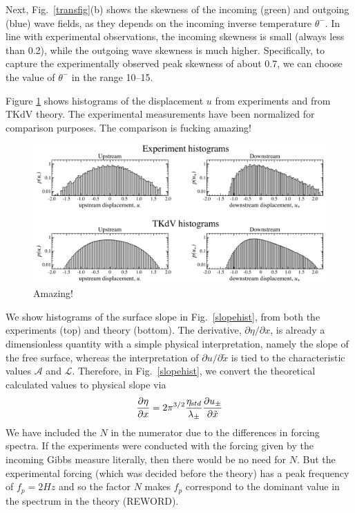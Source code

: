 \documentclass[11pt]{article}
\newcommand{\pd}[2]    { \frac{\partial #1} {\partial #2} }
\newcommand{\freqp}{f_p}
\newcommand{\etastd}{\eta_{\text std}}
\newcommand{\lam}{\lambda}
\newcommand{\lamupdn}{\lam_{\pm}}
\newcommand{\lamfac}{N}
\newcommand{\ampscale}{\mathcal{A}}
\newcommand{\lengthscale}{\mathcal{L}}
\newcommand{\uupdn}{u_{\pm}}
\newcommand{\thup}{\theta^{-}}
\begin{document}
Next, Fig.~\ref{transfig}(b) shows the skewness of the incoming (green) and outgoing (blue) wave fields, as they depends on the incoming inverse temperature $\thup$. In line with experimental observations, the incoming skewness is small (always less than 0.2), while the outgoing wave skewness is much higher. Specifically, to capture the experimentally observed peak skewness of about 0.7, we can choose the value of $\thup$ in the range 10--15.

Figure \ref{uhist} shows histograms of the displacement $u$ from experiments and from TKdV theory. The experimental measurements have been normalized for comparison purposes. The comparison is fucking amazing!

\begin{figure}%
\begin{center}
\includegraphics[width = 0.99 \linewidth]{Figs/uhist.pdf}
\caption{
Amazing!
}
\label{uhist}
\end{center}
\end{figure}

We show histograms of the surface slope in Fig.~\ref{slopehist}, from both the experiments (top) and theory (bottom). The derivative, $\partial \eta / \partial x$, is already a dimensionless quantity with a simple physical interpretation, namely the slope of the free surface, whereas the interpretation of $\partial u/\partial \tilde{x}$ is tied to the characteristic values $\ampscale$ and $\lengthscale$. 
Therefore, in Fig.~\ref{slopehist}, we convert the theoretical calculated values to physical slope via
\begin{equation}
\pd{\eta}{x} = 2 \pi^{3/2} \frac{\etastd}{\lamupdn} \pd{\uupdn}{\tilde{x}}
\end{equation}
We have included the $\lamfac$ in the numerator due to the differences in forcing spectra. If the experiments were conducted with the forcing given by the incoming Gibbs measure literally, then there would be no need for $\lamfac$. But the experimental forcing (which was decided before the theory) has a peak frequency of $\freqp = 2 Hz$ and so the factor $\lamfac$ makes $\freqp$ correspond to the dominant value in the spectrum in the theory (REWORD).
\end{document}
